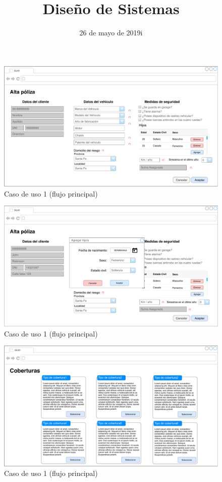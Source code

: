 \documentclass[12pt]{article}
\title{Diseño de Sistemas}
\date{26 de mayo de 2019i}
\begin{document}
\pagestyle{empty}		
\begin{titlepage}

\center
\end{titlepage}
\newpage
\pagestyle{fancy}


\vfill
\begin{figure}[h!]
\includegraphics[width=\textwidth]{CU1/CU-011.pdf}
\caption{Caso de uso 1 (flujo principal)}
\end{figure}
\vfill

\vfill
\begin{figure}[h!]
\includegraphics[width=\textwidth]{CU1/CU-012.pdf}
\caption{Caso de uso 1 (flujo principal)}
\end{figure}
\vfill

\vfill
\begin{figure}[h!]
\includegraphics[width=\textwidth]{CU1/CU-013.pdf}
\caption{Caso de uso 1 (flujo principal)}
\end{figure}
\vfill
\end{document}
